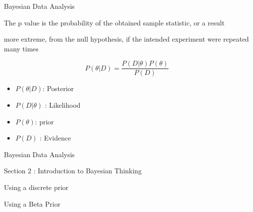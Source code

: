 
Bayesian Data Analysis


The p value is the probability of the obtained sample statistic, or a result 

more extreme, from the null hypothesis, if the intended experiment were repeated many times

\[ P(\theta|D ) = \frac{P(D|\theta)P(\theta)}{P(D)} \]



\begin{itemize}
\item $P(\theta|D )$: Posterior
\item $P(D|\theta)$ : Likelihood
\item $P(\theta)$: prior 

\item $P(D)$ :  Evidence
\end{itemize}


Bayesian Data Analysis


Section 2 : Introduction to Bayesian Thinking

 

Using a discrete prior

 

Using a Beta Prior

 

 

 





